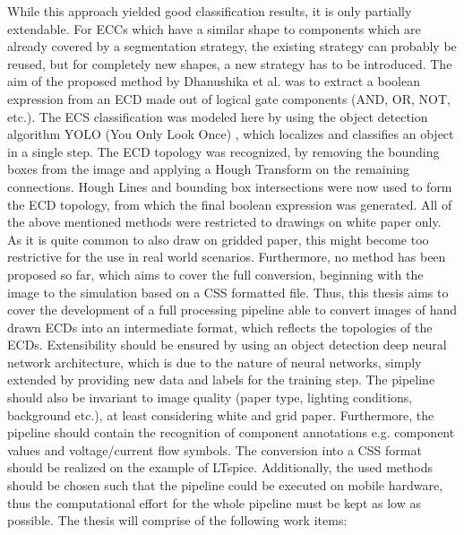 \documentclass{article} %
\begin{document}
While this approach yielded good classification results, it is only partially extendable.
For ECCs which have a similar shape to components which are already covered by a segmentation strategy, the existing strategy can probably be reused, but for completely new shapes, a new strategy has to be introduced.
The aim of the proposed method by Dhanushika et al. \cite{yolobool} was to extract a boolean expression from an ECD made out of logical gate components (AND, OR, NOT, etc.).
The ECS classification was modeled here by using the object detection algorithm YOLO (You Only Look Once) \cite{yolov1}, which localizes and classifies an object in a single step.
The ECD topology was recognized, by removing the bounding boxes from the image and applying a Hough Transform on the remaining connections.
Hough Lines and bounding box intersections were now used to form the ECD topology, from which the final boolean expression was generated.
\lf
All of the above mentioned methods were restricted to drawings on white paper only.
As it is quite common to also draw on gridded paper, this might become too restrictive for the use in real world scenarios.
Furthermore, no method has been proposed so far, which aims to cover the full conversion, beginning with the image to the simulation based on a CSS formatted file.
\lf
Thus, this thesis aims to cover the development of a full processing pipeline able to convert images of hand drawn ECDs into an intermediate format, which reflects the topologies of the ECDs.
Extensibility should be ensured by using an object detection deep neural network architecture, which is due to the nature of neural networks, simply extended by providing new data and labels for the training step.
The pipeline should also be invariant to image quality (paper type, lighting conditions, background etc.), at least considering white and grid paper.
Furthermore, the pipeline should contain the recognition of component annotations e.g. component values and voltage/current flow symbols.
The conversion into a CSS format should be realized on the example of LTspice.
Additionally, the used methods should be chosen such that the pipeline could be executed on mobile hardware, thus the computational effort for the whole pipeline must be kept as low as possible.
\lf
The thesis will comprise of the following work items:
\end{document}
